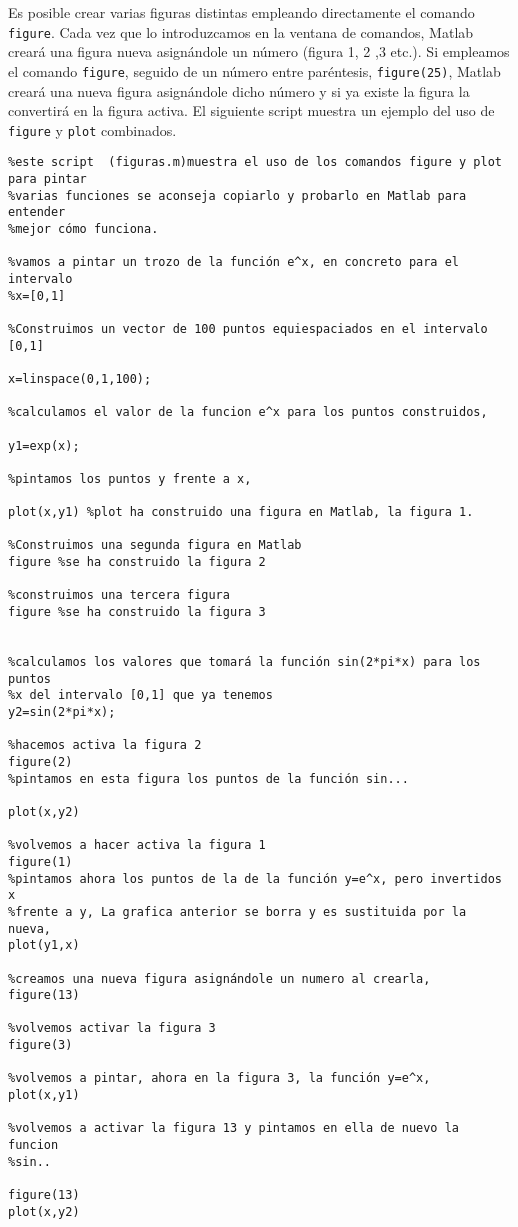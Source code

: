 Es posible crear varias figuras distintas empleando directamente el comando \texttt{figure}. Cada vez que lo introduzcamos en la ventana de comandos, Matlab creará una figura nueva asignándole un número (figura 1, 2 ,3 etc.). Si empleamos el comando \texttt{figure}, seguido de un número entre paréntesis, \texttt{figure(25)}, Matlab creará una nueva figura asignándole dicho número y si ya existe la figura la convertirá en la figura activa.
El siguiente script muestra un ejemplo del uso de \texttt{figure} y \texttt{plot} combinados.

\begin{verbatim}
%este script  (figuras.m)muestra el uso de los comandos figure y plot para pintar
%varias funciones se aconseja copiarlo y probarlo en Matlab para entender
%mejor cómo funciona.

%vamos a pintar un trozo de la función e^x, en concreto para el intervalo
%x=[0,1]

%Construimos un vector de 100 puntos equiespaciados en el intervalo [0,1]

x=linspace(0,1,100);

%calculamos el valor de la funcion e^x para los puntos construidos,

y1=exp(x);

%pintamos los puntos y frente a x,

plot(x,y1) %plot ha construido una figura en Matlab, la figura 1.

%Construimos una segunda figura en Matlab
figure %se ha construido la figura 2

%construimos una tercera figura 
figure %se ha construido la figura 3


%calculamos los valores que tomará la función sin(2*pi*x) para los puntos
%x del intervalo [0,1] que ya tenemos
y2=sin(2*pi*x);

%hacemos activa la figura 2
figure(2)
%pintamos en esta figura los puntos de la función sin...

plot(x,y2)

%volvemos a hacer activa la figura 1
figure(1)
%pintamos ahora los puntos de la de la función y=e^x, pero invertidos x
%frente a y, La grafica anterior se borra y es sustituida por la nueva,
plot(y1,x)

%creamos una nueva figura asignándole un numero al crearla,
figure(13)

%volvemos activar la figura 3
figure(3)

%volvemos a pintar, ahora en la figura 3, la función y=e^x,
plot(x,y1)

%volvemos a activar la figura 13 y pintamos en ella de nuevo la funcion
%sin..

figure(13)
plot(x,y2)
\end{verbatim}

